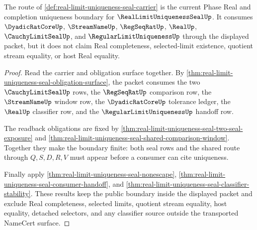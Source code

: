 \begin{theorem}
\label{thm:real-limit-uniqueness-seal-phase-real-boundary}
The route of \autoref{def:real-limit-uniqueness-seal-carrier} is the current Phase Real and completion uniqueness boundary for $\RealLimitUniquenessSealUp$. It consumes $\DyadicRatCoreUp$, $\StreamNameUp$, $\RegSeqRatUp$, $\RealUp$, $\CauchyLimitSealUp$, and $\RegularLimitUniquenessUp$ through the displayed packet, but it does not claim Real completeness, selected-limit existence, quotient stream equality, or host Real equality.
\end{theorem}
\begin{proof}
Read the carrier and obligation surface together. By \autoref{thm:real-limit-uniqueness-seal-obligation-surface}, the packet consumes the two $\CauchyLimitSealUp$ rows, the $\RegSeqRatUp$ comparison row, the $\StreamNameUp$ window row, the $\DyadicRatCoreUp$ tolerance ledger, the $\RealUp$ classifier row, and the $\RegularLimitUniquenessUp$ handoff row.

The readback obligations are fixed by \autoref{thm:real-limit-uniqueness-seal-two-seal-exposure} and \autoref{thm:real-limit-uniqueness-seal-shared-comparison-window}. Together they make the boundary finite: both seal rows and the shared route through $Q,S,D,R,V$ must appear before a consumer can cite uniqueness.

Finally apply \autoref{thm:real-limit-uniqueness-seal-nonescape}, \autoref{thm:real-limit-uniqueness-seal-consumer-handoff}, and \autoref{thm:real-limit-uniqueness-seal-classifier-stability}. These results keep the public boundary inside the displayed packet and exclude Real completeness, selected limits, quotient stream equality, host equality, detached selectors, and any classifier source outside the transported NameCert surface.
\end{proof}

